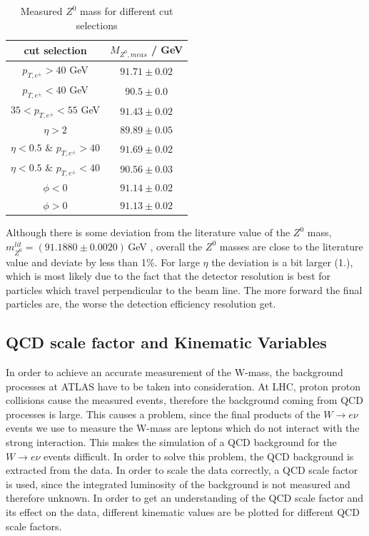    \begin{table}
        \centering
        \begin{tabular}{cc}
            \toprule
            \toprule
            cut selection & $M_{Z^0,meas}$ / GeV \\
            \midrule
            $p_{T,e^{\pm}} > 40$ GeV & $91.71 \pm 0.02$  \\
            $p_{T,e^{\pm}} < 40$ GeV & $90.5 \pm 0.0$ \\
            $35 < p_{T,e^{\pm}} < 55$ GeV & $91.43 \pm 0.02$  \\
            $\eta > 2$ & $89.89 \pm 0.05$  \\
            $\eta < 0.5$ \& $p_{T,e^{\pm}} > 40$ & $91.69 \pm 0.02$  \\
            $\eta < 0.5$ \& $p_{T,e^{\pm}} < 40$ & $90.56 \pm 0.03$  \\
            $\phi < 0$ & $91.14 \pm 0.02$  \\
            $\phi > 0$ & $91.13 \pm 0.02$  \\
            \bottomrule
            \bottomrule
        \end{tabular}
        \caption{Measured $Z^0$ mass for different cut selections}
        \label{tab:z-masses}
    \end{table}
    Although there is some deviation from the literature value of the $Z^0$ mass, $m_{Z^0}^{lit} = (91.1880 \pm 0.0020)$\,GeV \cite{PDG2024}, overall the $Z^0$ masses are close
    to the literature value and deviate by less than 1\%. For large $\eta$ the deviation is a bit larger (1.), which is most likely due to the fact that the detector resolution is 
    best for particles which travel perpendicular to the beam line. The more forward the final particles are, the worse the detection efficiency resolution get. 

\subsection{QCD scale factor and Kinematic Variables}
    \label{sec:qcd_factor/variables}
    In order to achieve an accurate measurement of the W-mass, the background processes at ATLAS have to be taken into consideration.
    At LHC, proton proton collisions cause the measured events, therefore the background coming from QCD processes is large. This causes a problem,
    since the final products of the $W \rightarrow e\nu$ events we use to measure the W-mass are leptons which do not interact with the strong interaction.
    This makes the simulation of a QCD background for the $W \rightarrow e\nu$ events difficult. In order to solve this problem, the QCD background is extracted
    from the data. In order to scale the data correctly, a QCD scale factor is used, since the integrated luminosity of the background is not measured and therefore
    unknown. In order to get an understanding of the QCD scale factor and its effect on the data, different kinematic values are be plotted for different 
    QCD scale factors.


